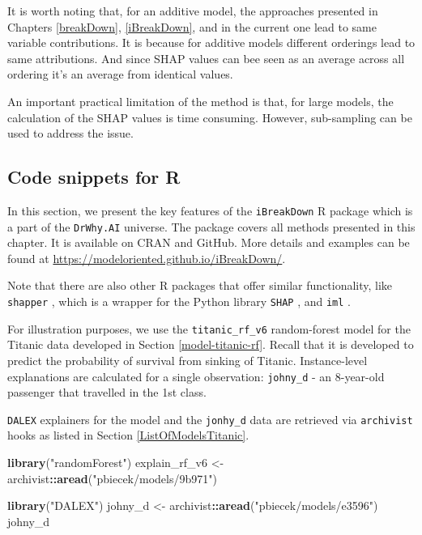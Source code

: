 \documentclass[12pt,]{krantz}
\newenvironment{Shaded}{\begin{snugshade}}{\end{snugshade}}
\newcommand{\KeywordTok}[1]{\textcolor[rgb]{0.13,0.29,0.53}{\textbf{#1}}}
\newcommand{\NormalTok}[1]{#1}
\newcommand{\OperatorTok}[1]{\textcolor[rgb]{0.81,0.36,0.00}{\textbf{#1}}}
\newcommand{\StringTok}[1]{\textcolor[rgb]{0.31,0.60,0.02}{#1}}
\begin{document}
It is worth noting that, for an additive model, the approaches presented in Chapters \ref{breakDown}, \ref{iBreakDown}, and in the current one lead to same variable contributions. It is because for additive models different orderings lead to same attributions. And since SHAP values can bee seen as an average across all ordering it's an average from identical values.

An important practical limitation of the method is that, for large models, the calculation of the SHAP values is time consuming. However, sub-sampling can be used to address the issue.

\hypertarget{SHAPRcode}{%
\subsection{Code snippets for R}\label{SHAPRcode}}

In this section, we present the key features of the \texttt{iBreakDown} R package \citep{iBreakDownRPackage} which is a part of the \texttt{DrWhy.AI} universe. The package covers all methods presented in this chapter. It is available on CRAN and GitHub. More details and examples can be found at \url{https://modeloriented.github.io/iBreakDown/}.

Note that there are also other R packages that offer similar functionality, like \texttt{shapper} \citep{shapperPackage}, which is a wrapper for the Python library \texttt{SHAP} \citep{shapPackage}, and \texttt{iml} \citep{imlRPackage}.

For illustration purposes, we use the \texttt{titanic\_rf\_v6} random-forest model for the Titanic data developed in Section \ref{model-titanic-rf}. Recall that it is developed to predict the probability of survival from sinking of Titanic. Instance-level explanations are calculated for a single observation: \texttt{johny\_d} - an 8-year-old passenger that travelled in the 1st class.

\texttt{DALEX} explainers for the model and the \texttt{jonhy\_d} data are retrieved via \texttt{archivist} hooks as listed in Section \ref{ListOfModelsTitanic}.

\begin{Shaded}
\begin{Highlighting}[]
\KeywordTok{library}\NormalTok{(}\StringTok{"randomForest"}\NormalTok{)}
\NormalTok{explain_rf_v6 <-}\StringTok{ }\NormalTok{archivist}\OperatorTok{::}\KeywordTok{aread}\NormalTok{(}\StringTok{"pbiecek/models/9b971"}\NormalTok{)}

\KeywordTok{library}\NormalTok{(}\StringTok{"DALEX"}\NormalTok{)}
\NormalTok{johny_d <-}\StringTok{ }\NormalTok{archivist}\OperatorTok{::}\KeywordTok{aread}\NormalTok{(}\StringTok{"pbiecek/models/e3596"}\NormalTok{)}
\NormalTok{johny_d}
\end{Highlighting}
\end{Shaded}
\end{document}
